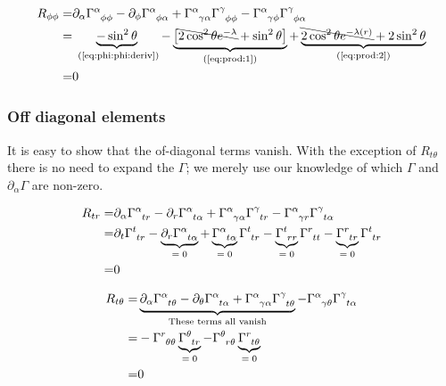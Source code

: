 \documentclass[]{article}
\begin{document}
\begin{align*} 
	R_{\phi\phi} =& \partial_\alpha \Gamma\indices{^\alpha_{\phi\phi}} - \partial_\phi \Gamma\indices{^\alpha_{\phi\alpha}} + \Gamma\indices{^\alpha_{\gamma\alpha}} \Gamma\indices{^\gamma_{\phi\phi}} - \Gamma\indices{^\alpha_{\gamma\phi}} \Gamma\indices{^\gamma_{\phi\alpha}}\\
	=&\underbrace{ -\sin^2\theta}_\text{ (\ref{eq:phi:phi:deriv})} - \underbrace{\big[\bcancel{2\cos^2\theta e^{-\lambda}} +\sin^2\theta\big]}_\text{(\ref{eq:prod:1})} + \underbrace{\bcancel{2 \cos^2 \theta e^{- \lambda(r)}}   + 2  \sin^2\theta}_\text{(\ref{eq:prod:2})}\\
	=&0
\end{align*}



\subsubsection{Off diagonal elements}
It is easy to show that the of-diagonal terms vanish. With the exception of $R_{t\theta}$ there is no need to expand the $\Gamma$; we merely use our knowledge of which $\Gamma$ and $\partial_\alpha \Gamma$ are non-zero.

\begin{align*}
	R_{tr} =& \partial_\alpha \Gamma\indices{^\alpha_{tr}} - \partial_r \Gamma\indices{^\alpha_{t\alpha}} + \Gamma\indices{^\alpha_{\gamma\alpha}} \Gamma\indices{^\gamma_{tr}} - \Gamma\indices{^\alpha_{\gamma r}} \Gamma\indices{^\gamma_{t\alpha}}\\
	=&\partial_t \Gamma\indices{^t_{tr}} - \underbrace{\partial_r \Gamma\indices{^\alpha_{t\alpha}}}_\text{$=0$} + \underbrace{\Gamma\indices{^\alpha_{t\alpha}}}_\text{$=0$} \Gamma\indices{^t_{tr}} - \underbrace{\Gamma\indices{^t_{r r}}}_\text{$=0$} \Gamma\indices{^r_{tt}} -\underbrace{ \Gamma\indices{^r_{t r}}}_\text{$=0$} \Gamma\indices{^t_{tr}}\\
	=&0
\end{align*}

\begin{align*}
	R_{t\theta} =& \underbrace{\partial_\alpha \Gamma\indices{^\alpha_{t\theta}} - \partial_\theta \Gamma\indices{^\alpha_{t\alpha}} + \Gamma\indices{^\alpha_{\gamma\alpha}} \Gamma\indices{^\gamma_{t\theta}}}_\text{These terms all vanish} - \Gamma\indices{^\alpha_{\gamma\theta}} \Gamma\indices{^\gamma_{t\alpha}}\\
	=&  - \Gamma\indices{^r_{\theta\theta}} \underbrace{\Gamma\indices{^\theta_{tr}}}_\text{$=0$}  - \Gamma\indices{^\theta_{r\theta}} \underbrace{\Gamma\indices{^r_{t\theta}}}_\text{$=0$} \\
	=&0 
\end{align*}
\end{document}
